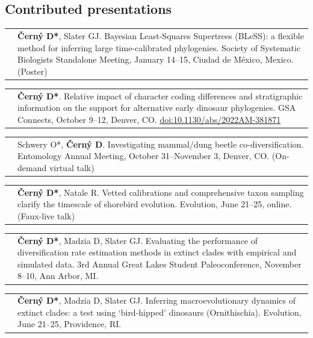 \documentclass[10pt]{article}
\begin{document}
\subsection*{Contributed presentations}

\begin{tabularx}{\textwidth}{>{\raggedleft\arraybackslash}p{2.2cm} X}
2023 & \textbf{\v{C}ern\'{y} D*}, Slater GJ. Bayesian Least-Squares Supertrees (BLeSS): a flexible method for inferring large time-calibrated phylogenies. Society of Systematic Biologists Standalone Meeting, January 14--15, Ciudad de M\'{e}xico, Mexico. (Poster)
\end{tabularx}
\begin{tabularx}{\textwidth}{>{\raggedleft\arraybackslash}p{2.2cm} X}
2022 & \textbf{\v{C}ern\'{y} D*}. Relative impact of character coding differences and stratigraphic information on the support for alternative early dinosaur phylogenies. GSA Connects, October 9--12, Denver, CO. \href{ https://doi.org/10.1130/abs/2022AM-381871}{doi:10.1130/abs/2022AM-381871}
\end{tabularx}
\begin{tabularx}{\textwidth}{>{\raggedleft\arraybackslash}p{2.2cm} X}
2021 & Schwery O*, \textbf{\v{C}ern\'{y} D}. Investigating mammal/dung beetle co-diversification. Entomology Annual Meeting, October 31--November 3, Denver, CO. (On-demand virtual talk)
\end{tabularx}
\begin{tabularx}{\textwidth}{>{\raggedleft\arraybackslash}p{2.2cm} X}
2021 & \textbf{\v{C}ern\'{y} D*}, Natale R. Vetted calibrations and comprehensive taxon sampling clarify the timescale of shorebird evolution. Evolution, June 21--25, online. (Faux-live talk)
\end{tabularx}
\begin{tabularx}{\textwidth}{>{\raggedleft\arraybackslash}p{2.2cm} X}
2019 & \textbf{\v{C}ern\'{y} D*}, Madzia D, Slater GJ. Evaluating the performance of diversification rate estimation methods in extinct clades with empirical and simulated data. 3rd Annual Great Lakes Student Paleoconference, November 8--10, Ann Arbor, MI.
\end{tabularx}
\begin{tabularx}{\textwidth}{>{\raggedleft\arraybackslash}p{2.2cm} X}
2019 & \textbf{\v{C}ern\'{y} D*}, Madzia D, Slater GJ. Inferring macroevolutionary dynamics of extinct clades: a test using `bird-hipped' dinosaurs (Ornithischia). Evolution, June 21--25, Providence, RI.
\end{tabularx}
\end{document}
